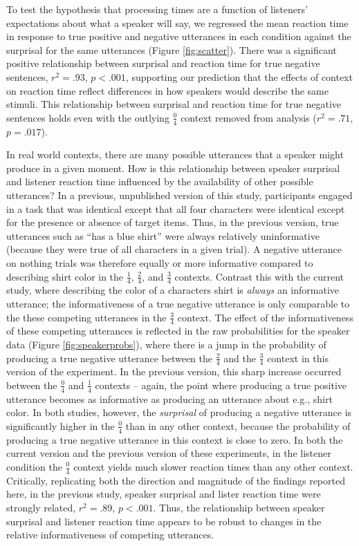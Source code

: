 \documentclass[man, noapacite]{apa2}
\begin{document}
To test the hypothesis that processing times are a function of listeners' expectations about what a speaker will say, we regressed the mean reaction time in response to true positive and negative utterances in each condition against the surprisal for the same utterances (Figure \ref{fig:scatter}).  There was a significant positive relationship between surprisal and reaction time for true negative sentences, $r^2=.93$, $p<.001$, supporting our prediction that the effects of context on reaction time reflect differences in how speakers would describe the same stimuli. This relationship between surprisal and reaction time for true negative sentences holds even with the outlying $\frac{0}{4}$ context removed from analysis ($r^2=.71$, $p = .017$).

In real world contexts, there are many possible utterances that a speaker might produce in a given moment. How is this relationship between speaker surprisal and listener reaction time influenced by the availability of other possible utterances? In a previous, unpublished version of this study, participants engaged in a task that was identical except that all four characters were identical except for the presence or absence of target items. Thus, in the previous version, true utterances such as ``has a blue shirt'' were always relatively uninformative (because they were true of all characters in a given trial). A negative utterance on nothing trials was therefore equally or more informative compared to describing shirt color in the $\frac{1}{4}$, $\frac{2}{4}$, and $\frac{3}{4}$ contexts. Contrast this with the current study, where describing the color of a characters shirt is \emph{always} an informative utterance; the informativeness of a true negative utterance is only comparable to the these competing utterances in the $\frac{3}{4}$ context. The effect of the informativeness of these competing utterances is reflected in the raw probabilities for the speaker data (Figure \ref{fig:speakerprobs}), where there is a jump in the probability of producing a true negative utterance between the $\frac{2}{4}$ and the $\frac{3}{4}$ context in this version of the experiment. In the previous version, this sharp increase occurred between the $\frac{0}{4}$ and $\frac{1}{4}$ contexts -- again, the point where producing a true positive utterance becomes as informative as producing an utterance about e.g., shirt color. In both studies, however, the \emph{surprisal} of producing a negative utterance is significantly higher in the $\frac{0}{4}$ than in any other context, because the probability of producing a true negative utterance in this context is close to zero. In both the current version and the previous version of these experiments, in the listener condition the $\frac{0}{4}$ context yields much slower reaction times than any other context. Critically, replicating both the direction and magnitude of the findings reported here, in the previous study, speaker surprisal and lister reaction time were strongly related, $r^2=.89$, $p<.001$. Thus, the relationship between speaker surprisal and listener reaction time appears to be robust to changes in the relative informativeness of competing utterances.
\end{document}

